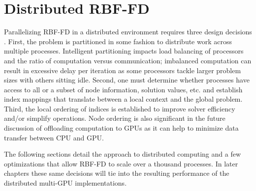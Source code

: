 \documentclass{report}
\begin{document}
\chapter{Distributed RBF-FD}
\label{chap:distributed_rbffd}

Parallelizing RBF-FD in a distributed environment requires three
design decisions \cite{Saad2003}. First, the problem is partitioned in some fashion to distribute work across multiple processes. Intelligent partitioning
impacts load balancing of processors and the ratio of computation versus communication; imbalanced computation can result in excessive delay per
iteration as some processors tackle larger problem sizes with others sitting idle. Second, one must determine whether processes have access to all or a subset of node information,
solution values, etc. and establish index mappings that translate between a local context and the global problem. Third, the local ordering of indices is established to improve solver efficiency and/or simplify operations. Node
ordering is also significant in the future discussion of offloading computation to GPUs as it can help to minimize data transfer between CPU and GPU. 

The following sections detail the approach to distributed computing and a few optimizations that allow RBF-FD to scale over a thousand processes. In later chapters these same decisions will tie into the resulting performance of the distributed multi-GPU implementations. 

%
%
%
%
\end{document}
